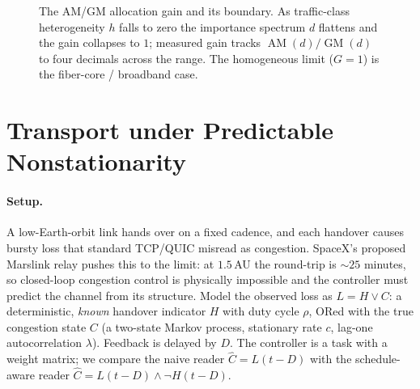 \documentclass[11pt]{article}
\theoremstyle{definition}
\theoremstyle{remark}
\newcommand{\AM}{\operatorname{AM}}
\newcommand{\GM}{\operatorname{GM}}
\begin{document}
\begin{figure}[t]
\centering
{}
\caption{The AM/GM allocation gain and its boundary. As traffic-class
heterogeneity $h$ falls to zero the importance spectrum $d$ flattens and
the gain collapses to $1$; measured gain tracks $\AM(d)/\GM(d)$ to four
decimals across the range. The homogeneous limit ($G=1$) is the
fiber-core / broadband case.}
\label{fig:sc1}
\end{figure}

\section{Transport under Predictable Nonstationarity}
\label{sec:sc2}

\paragraph{Setup.}
A low-Earth-orbit link hands over on a fixed cadence, and each handover
causes bursty loss that standard TCP/QUIC misread as congestion. SpaceX's
proposed Marslink relay pushes this to the limit: at $1.5$\,AU the
round-trip is $\sim\!25$ minutes, so closed-loop congestion control is
physically impossible and the controller must predict the channel from
its structure. Model the observed loss as $L=H\vee C$: a deterministic,
\emph{known} handover indicator $H$ with duty cycle $\rho$, ORed with the
true congestion state $C$ (a two-state Markov process, stationary rate
$c$, lag-one autocorrelation $\lambda$). Feedback is delayed by $D$. The
controller is a task with a weight matrix; we compare the naive
reader $\hat C=L(t\!-\!D)$ with the schedule-aware reader
$\hat C=L(t\!-\!D)\wedge\neg H(t\!-\!D)$.
\end{document}

